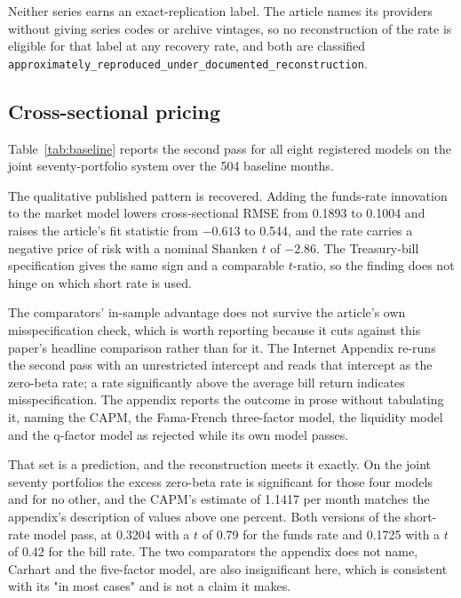 \documentclass[11pt]{article}
\begin{document}
Neither series earns an exact-replication label. The article names its providers
without giving series codes or archive vintages, so no reconstruction of the rate
is eligible for that label at any recovery rate, and both are classified
\texttt{approximately\_reproduced\_under\_documented\_reconstruction}. %

\subsection{Cross-sectional pricing}

Table~\ref{tab:baseline} reports the second pass for all eight registered models
on the joint seventy-portfolio system over the 504 baseline months. %



The qualitative published pattern is recovered. Adding the funds-rate innovation to
the market model lowers cross-sectional RMSE from 0.1893 to 0.1004 and raises the %
article's fit statistic from $-0.613$ to 0.544, and the rate carries a negative %
price of risk with a nominal Shanken $t$ of $-2.86$. The Treasury-bill specification %
gives the same sign and a comparable $t$-ratio, so the finding does not hinge on
which short rate is used. %

The comparators' in-sample advantage does not survive the article's own
misspecification check, which is worth reporting because it cuts against this
paper's headline comparison rather than for it. The Internet Appendix re-runs the
second pass with an unrestricted intercept and reads that intercept as the
zero-beta rate; a rate significantly above the average bill return indicates
misspecification. The appendix reports the outcome in prose without tabulating
it, naming the CAPM, the Fama-French three-factor model, the liquidity model and
the q-factor model as rejected while its own model passes.

That set is a prediction, and the reconstruction meets it exactly. On the joint
seventy portfolios the excess zero-beta rate is significant for those four models
and for no other, and the CAPM's estimate of 1.1417 per month matches the %
appendix's description of values above one percent. Both versions of the %
short-rate model pass, at 0.3204 with a $t$ of 0.79 for the funds rate and %
0.1725 with a $t$ of 0.42 for the bill rate. The two comparators the appendix %
does not name, Carhart and the five-factor model, are also insignificant here,
which is consistent with its "in most cases" and is not a claim it makes.
\end{document}
